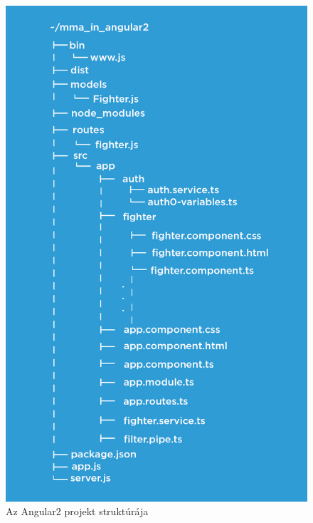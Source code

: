 \begin{figure}[htb]
\centering
\includegraphics[scale=0.7]{kepek/mma_in_angular2.jpeg}
\caption{Az Angular2 projekt struktúrája}
\label{fig:angularjs_structure}
\end{figure}
